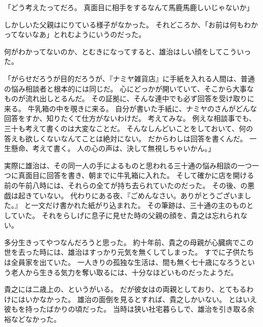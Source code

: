\documentclass[chapter3.tex]{subfiles}
\begin{document}
\begin{CJK}{UTF8}{ipxm}
    「どう考えたってだろ。
    真面目に相手をするなんて馬鹿馬鹿しいじゃないか」

    しかしいた父親はにりている様子がなかった。
    それどころか、「お前は何もわかってないなあ」とれむようにいうのだった。

    何がわかってないのか、とむきになってすると、雄治はしい顔をしてこういった。

    「がらせだろうが目的だろうが、『ナミヤ雑貨店』に手紙を入れる人間は、普通の悩み相談者と根本的には同じだ。
    心にどっかが開いていて、そこから大事なものが流れ出しとるんだ。
    その証拠に、そんな連中でも必ず回答を受け取りに来る。
    牛乳箱の中を覗きに来る。
    自分が書いた手紙に、ナミヤのさんがどんな回答をすか、知りたくて仕方がないわけだ。
    考えてみな。
    例えな相談事でも、三十も考えて書くのは大変なことだ。
    そんなしんどいことをしておいて、何の答えも欲しくないなんてことは絶対にない。
    だからわしは回答を書くんだ。
    一生懸命、考えて書く。
    人の心の声は、決して無視しちゃいかん。」

    実際に雄治は、その同一人の手によるものと思われる三十通の悩み相談の一つ一つに真面目に回答を書き、朝までに牛乳箱に入れた。
    そして確かに店を開ける前の午前八時には、それらの全てが持ち去られていたのだった。
    その後、の悪戯は起きていない。
    代わりにある夜、『ごめんなさい。ありがとうございました。』
    と一文だけ書かれた紙がり込まれた。
    その筆跡は、三十通の主のものとしていた。
    それをらしげに息子に見せた時の父親の顔を、貴之は忘れられない。

    多分生きってやつなんだろうと思った。
    約十年前、貴之の母親が心臓病でこの世を去った時には、雄治はすっかり元気を無くしてしまった。
    すでに子供たちは全員家を出ていた。
    一人きりの孤独な生活は、間も無く七十歳になろうという老人から生きる気力を奪い取るには、十分なほどいものだったようだ。

    貴之には二歳上の、というがいる。
    だが彼女はの両親としており、とてもるわけにはいかなかった。
    雄治の面倒を見るとすれば、貴之しかいない。
    とはいえ彼もを持ったばかりの頃だった。
    当時は狭い社宅暮らしで、雄治を引き取る余裕などなかった。


\end{CJK}
\end{document}
